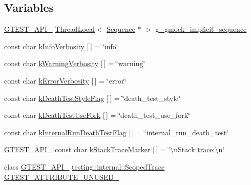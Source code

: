\subsection*{Variables}
\begin{DoxyCompactItemize}
\item 
\hyperlink{gtest-port_8h_aa73be6f0ba4a7456180a94904ce17790}{G\+T\+E\+S\+T\+\_\+\+A\+P\+I\+\_\+} \hyperlink{classtesting_1_1internal_1_1ThreadLocal}{Thread\+Local}$<$ \hyperlink{classtesting_1_1Sequence}{Sequence} $\ast$ $>$ \hyperlink{namespacetesting_1_1internal_af4407fe8aeb1e43b2f58940736a20590}{g\+\_\+gmock\+\_\+implicit\+\_\+sequence}
\item 
const char \hyperlink{namespacetesting_1_1internal_a96274a788ffc75a6dffdfa8aa1f34fb9}{k\+Info\+Verbosity} \mbox{[}$\,$\mbox{]} = \char`\"{}info\char`\"{}
\item 
const char \hyperlink{namespacetesting_1_1internal_ad9386ccda6b6deac2f7b84784d3088c0}{k\+Warning\+Verbosity} \mbox{[}$\,$\mbox{]} = \char`\"{}warning\char`\"{}
\item 
const char \hyperlink{namespacetesting_1_1internal_a3d730761274e7b80dd66e5014171fcb5}{k\+Error\+Verbosity} \mbox{[}$\,$\mbox{]} = \char`\"{}error\char`\"{}
\item 
const char \hyperlink{namespacetesting_1_1internal_a008ebfe0c0347d65e5e06e4d310981b3}{k\+Death\+Test\+Style\+Flag} \mbox{[}$\,$\mbox{]} = \char`\"{}death\+\_\+test\+\_\+style\char`\"{}
\item 
const char \hyperlink{namespacetesting_1_1internal_a32051e2574562b548be3e26a52eaa553}{k\+Death\+Test\+Use\+Fork} \mbox{[}$\,$\mbox{]} = \char`\"{}death\+\_\+test\+\_\+use\+\_\+fork\char`\"{}
\item 
const char \hyperlink{namespacetesting_1_1internal_a8572303d929880adf30db00952e1c45d}{k\+Internal\+Run\+Death\+Test\+Flag} \mbox{[}$\,$\mbox{]} = \char`\"{}internal\+\_\+run\+\_\+death\+\_\+test\char`\"{}
\item 
\hyperlink{gtest-port_8h_aa73be6f0ba4a7456180a94904ce17790}{G\+T\+E\+S\+T\+\_\+\+A\+P\+I\+\_\+} const char \hyperlink{namespacetesting_1_1internal_abb38528ca6a45df265b19f5ccb3d16d9}{k\+Stack\+Trace\+Marker} \mbox{[}$\,$\mbox{]} = \char`\"{}\textbackslash{}n\+Stack \hyperlink{app_2main_8cpp_acfc02ec89670db29251fda6a66602ce2}{trace\+:\textbackslash{}n}\char`\"{}
\item 
class \hyperlink{gtest-port_8h_aa73be6f0ba4a7456180a94904ce17790}{G\+T\+E\+S\+T\+\_\+\+A\+P\+I\+\_\+} \hyperlink{classtesting_1_1internal_1_1ScopedTrace}{testing\+::internal\+::\+Scoped\+Trace} \hyperlink{namespacetesting_1_1internal_a581ac897511489c75a06aa328dcfb62f}{G\+T\+E\+S\+T\+\_\+\+A\+T\+T\+R\+I\+B\+U\+T\+E\+\_\+\+U\+N\+U\+S\+E\+D\+\_\+}

\end{DoxyCompactItemize}

